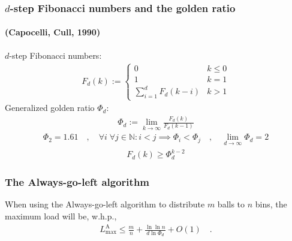 \documentclass[serif,professionalfonts]{beamer}
\newcommand\load{L_{\mathrm{max}}}
\newcommand\loadAgl{\load^{\mathrm{A}}}
\begin{document}
\begin{frame}
\frametitle{$d$-step Fibonacci numbers and the golden ratio}
\framesubtitle{(Capocelli, Cull, 1990)}

$d$-step Fibonacci numbers:
\begin{align*}
F_d(k) := \begin{cases}
                0               & k \leq 0\\
                1               & k = 1\\
                \sum_{i=1}^{d}F_d(k-i) & k > 1
            \end{cases}
\end{align*}
Generalized golden ratio $\Phi_d$:
\begin{align*}
\Phi_d := \lim_{k \rightarrow \infty} \frac{F_d(k)}{F_d(k-1)}
\end{align*}
\begin{align*}
\Phi_2 = 1.61 \quad , \quad \forall i\; \forall j \in \mathbb{N}: i < j \implies \Phi_i < \Phi_j \quad , \quad \lim_{d\rightarrow \infty} \Phi_d = 2 
\end{align*}
\begin{align*}
F_d(k) \geq \Phi_d^{k-2}
\end{align*}
\end{frame}

\newcommand\theoremVocking{
\begin{theorem}[V\"ocking, 2003]
When using the \alert{Always-go-left} algorithm to distribute $m$ balls to $n$ bins, the maximum load will be, w.h.p.,
\begin{align*}
\loadAgl \leq \frac{m}{n} + \frac{\ln \ln n}{d \ln \Phi_d} + O(1) \quad .
\end{align*}
\end{theorem}
}

\begin{frame}[shrink]
\frametitle{The Always-go-left algorithm}
\aglAlgorithm
\theoremVocking
\end{frame}
\end{document}
